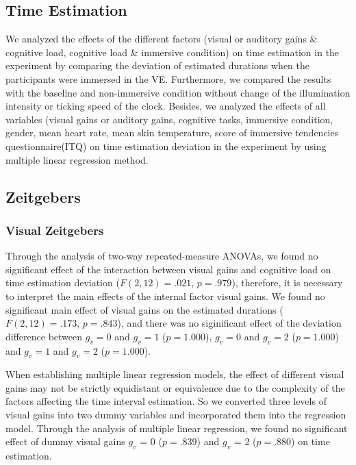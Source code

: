 \documentclass[sigconf]{acmart}
\begin{document}
\subsection{Time Estimation}

We analyzed the effects of the different factors (visual or auditory gains \& cognitive load,  cognitive load \& immersive condition) on time estimation in the experiment by comparing the deviation of estimated durations when the participants were immersed in the VE. Furthermore, we compared the results with the baseline and non-immersive condition without change of the illumination intensity or ticking speed of the clock.
Besides, we analyzed the effects of all variables (visual gains or auditory gains, cognitive tasks, immersive condition, gender,  mean heart rate, mean skin temperature, score of immersive tendencies questionnaire(ITQ) on time estimation deviation in the experiment by using multiple linear regression method.

\subsection*{Zeitgebers}

\subsubsection{Visual Zeitgebers}

Through the analysis of two-way repeated-measure ANOVAs, we found no significant effect of the interaction between visual gains and cognitive load on time estimation deviation ($F(2,12) = .021$, $p = .979$), therefore, it is necessary to interpret the main effects of the internal factor visual gains. We found no significant main effect of visual gains on the estimated durations ($F(2,12) = .173$, $p = .843$), and there was no siginificant effect of the deviation difference between $g_v = 0$ and $g_v = 1$ ($p = 1.000$), $g_v = 0$ and $g_v = 2$ ($p = 1.000$) and $g_v = 1$ and $g_v = 2$ ($p = 1.000$).

When establishing multiple linear regression models, the effect of different visual gains may not be strictly equidistant or equivalence due to the complexity of the factors affecting the time interval estimation. So we converted three levels of visual  gains into two dummy variables and incorporated them into the regression model. Through the analysis of multiple linear regression, we found no significant effect of dummy visual gains $g_v$ = 0 ($p = .839$) and $g_v$ = 2 ($p = .880$) on time estimation.
\end{document}
